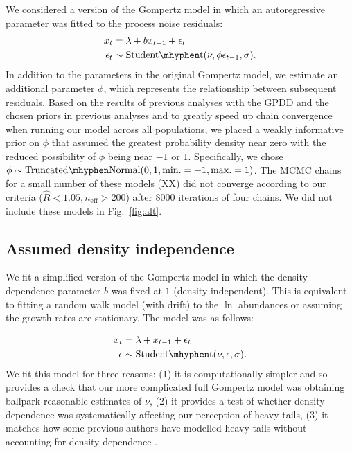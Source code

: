 We considered a version of the Gompertz model in which an autoregressive parameter was fitted to the process noise residuals: 
\begin{align*}
x_t &= \lambda + b x_{t-1} + \epsilon_t\\
\epsilon_t &\sim \mathrm{Student\mhyphen t}(\nu, \phi \epsilon_{t-1}, \sigma).
\end{align*}
In addition to the parameters in the original Gompertz model, we estimate an additional parameter $\phi$, which represents the relationship between subsequent residuals. Based on the results of previous analyses with the GPDD \citep[e.g.][]{connors2014} and the chosen priors in previous analyses \citep[e.g.][]{thorson2014a} and to greatly speed up chain convergence when running our model across all populations, we placed a weakly informative prior on $\phi$ that assumed the greatest probability density near zero with the reduced possibility of $\phi$ being near $-1$ or $1$. Specifically, we chose $\phi \sim \mathrm{Truncated\mhyphen Normal}(0, 1, \mathrm{min.} = -1, \mathrm{max.} = 1)$. The MCMC chains for a small number of these models (XX) did not converge according to our criteria ($\widehat{R} < 1.05, n_\mathrm{eff} > 200$) after 8000 iterations of four chains. We did not include these models in Fig.~\ref{fig:alt}.

\subsection{Assumed density independence}\label{assumed-density-independence}

We fit a simplified version of the Gompertz model in which the density dependence parameter $b$ was fixed at $1$ (density independent). This is equivalent to fitting a random walk model (with drift) to the $\ln$ abundances or assuming the growth rates are stationary. The model was as follows: 

\begin{align*}
x_t &= \lambda + x_{t-1} + \epsilon_t\\
\epsilon &\sim \mathrm{Student\mhyphen t}(\nu, \epsilon, \sigma).
\end{align*}
We fit this model for three reasons: (1) it is computationally simpler and so provides a check that our more complicated full Gompertz model was obtaining ballpark reasonable estimates of $\nu$, (2) it provides a test of whether density dependence was systematically affecting our perception of heavy tails, (3) it matches how some previous authors have modelled heavy tails without accounting for density dependence \citep{segura2013}.

